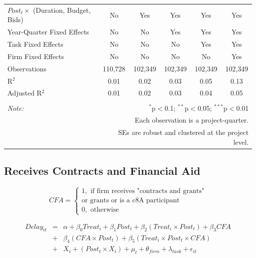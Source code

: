 \documentclass[
]{article}
\begin{document}
\begin{table}[H]
\begin{tabular}{@{\extracolsep{-2pt}}lccccc}
$Post_t \times $  (Duration, Budget, Bids) & No & Yes & Yes & Yes & Yes \\ 
Year-Quarter Fixed Effects & No & No & Yes & Yes & Yes \\ 
Task Fixed Effects & No & No & No & Yes & Yes \\ 
Firm Fixed Effects & No & No & No & No & Yes \\ 
Observations & 110,728 & 102,349 & 102,349 & 102,349 & 102,349 \\ 
R$^{2}$ & 0.01 & 0.02 & 0.03 & 0.05 & 0.13 \\ 
Adjusted R$^{2}$ & 0.01 & 0.02 & 0.03 & 0.04 & 0.05 \\ 
\hline 
\hline \\[-1.8ex] 
\textit{Note:}  & \multicolumn{5}{r}{$^{*}$p$<$0.1; $^{**}$p$<$0.05; $^{***}$p$<$0.01} \\ 
 & \multicolumn{5}{r}{Each observation is a project-quarter.} \\ 
 & \multicolumn{5}{r}{SEs are robust and clustered at the project level.} \\ 
\end{tabular} 
\end{table}

\hypertarget{receives-contracts-and-financial-aid}{%
\subsection{Receives Contracts and Financial
Aid}\label{receives-contracts-and-financial-aid}}

\[ CFA = \begin{cases} 1, \text{ if firm receives "contracts and grants"}\\ 
                       \text{or grants or is a c8A participant}\\
0, \text{ otherwise} \end{cases}\]

\[ \begin{aligned}
Delay_{it} &=& \alpha+\beta_0 Treat_i + \beta_1 Post_t + \beta_2 (Treat_i \times Post_t) +\beta_3 CFA \\
&+& \beta_4 (CFA \times Post_t) + \beta_5 (Treat_i \times Post_t \times CFA) \\ 
&+&X_i + (Post_t \times X_i) + \mu_t + \theta_{firm} + \lambda_{task}+ \epsilon_{it}
\end{aligned}\]
\end{document}
